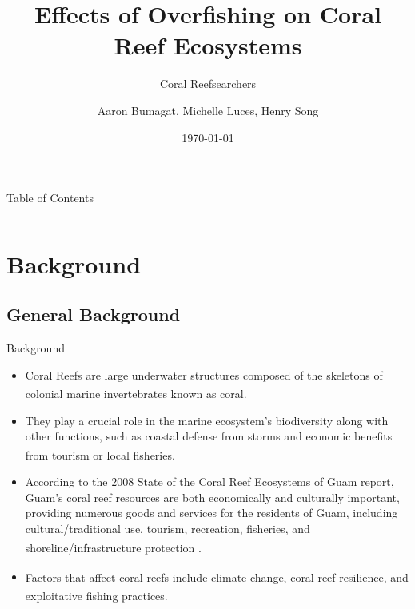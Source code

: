 \documentclass{beamer}
\title[]{Effects of Overfishing on Coral Reef Ecosystems}
\subtitle{Coral Reefsearchers}
\author{Aaron Bumagat, Michelle Luces, Henry Song }
\institute{University of Guam}
\date{\today}
\begin{document}
\frame{\titlepage}


\AtBeginSection[]{
    \begin{frame}{}
        \frametitle{}
        \setcounter{tocdepth}{2}
        \tableofcontents[currentsection, sections = \thesection]
        \setcounter{tocdepth}{1}
    \end{frame}
}

\begin{frame}{Table of Contents}
    \begin{columns}[onlytextwidth,T]
        \begin{column}{.45\textwidth}
            \tableofcontents[sections=1-2]
        \end{column}
        \begin{column}{.45\textwidth}
            \tableofcontents[sections=3-6]
        \end{column}
    \end{columns}
\end{frame}


\section{Background}

\subsection{General Background}
\begin{frame}{Background}
    \begin{itemize}
        \item<1-> Coral Reefs are large underwater structures composed of the skeletons of colonial marine invertebrates known as coral\textsuperscript{\cite{ross}}.
         \item<2-> They play a crucial role in the marine ecosystem's biodiversity along with other functions, such as coastal defense from storms and economic benefits from tourism or local fisheries\textsuperscript{\cite{04_mathanalysis}}.
         \item<3-> According to the 2008 State of the Coral Reef Ecosystems of Guam report, Guam’s coral reef resources are both economically and culturally important, providing numerous goods and services for the residents of Guam, including cultural/traditional use, tourism, recreation, fisheries, and shoreline/infrastructure protection \textsuperscript{\cite{guamwebsite}}.
         \item<4-> Factors that affect coral reefs include climate change, coral reef resilience\textsuperscript{\cite{02_Riegl_Purkis_Model}}, and exploitative fishing practices\textsuperscript{\cite{05_quintero_machuca_cotto_bradley_ríos-soto_2016}}.
    \end{itemize}
\end{frame}
\end{document}

